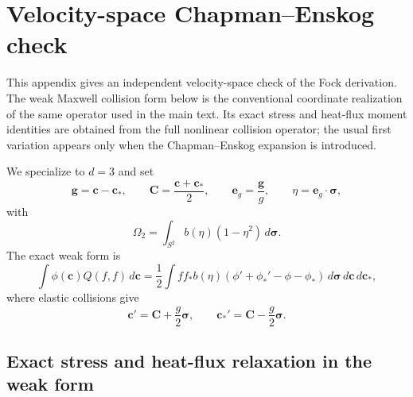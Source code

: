 \documentclass[11pt,oneside]{article}
\numberwithin{equation}{section}
\theoremstyle{definition}
\begin{document}
\appendix
\section{Velocity-space Chapman--Enskog check}
\label{app:maxwell_coordinate_CE_check}

This appendix gives an independent velocity-space check of the Fock derivation.  The weak Maxwell collision form below is the conventional coordinate realization of the same operator used in the main text.  Its exact stress and heat-flux moment identities are obtained from the full nonlinear collision operator; the usual first variation appears only when the Chapman--Enskog expansion is introduced.

We specialize to $d=3$ and set
\begin{equation}
\bm g=\bm c-\bm c_*,\qquad
\bm C=\frac{\bm c+\bm c_*}{2},\qquad
\bm e_g=\frac{\bm g}{g},\qquad
\eta=\bm e_g\cdot\bm\sigma,
\end{equation}
with
\begin{equation}
\Omega_2=\int_{S^2}b(\eta)(1-\eta^2)\,d\bm\sigma.
\end{equation}
The exact weak form is
\begin{equation}
\int\phi(\bm c)Q(f,f)\,d\bm c
=\frac12\int ff_*b(\eta)
\left(\phi'+\phi_*'-\phi-\phi_*\right)
\,d\bm\sigma\,d\bm c\,d\bm c_*,
\label{eq:app_maxwell_weak_form}
\end{equation}
where elastic collisions give
\begin{equation}
\bm c'=\bm C+\frac g2\bm\sigma,\qquad
\bm c_*'=\bm C-\frac g2\bm\sigma.
\end{equation}

\subsection{Exact stress and heat-flux relaxation in the weak form}
\end{document}
